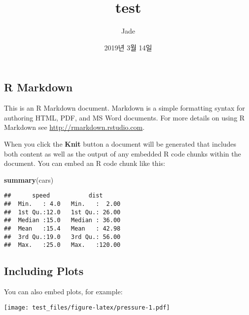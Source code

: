 \documentclass[]{article}
\title{test}
\author{Jade}
\date{2019년 3월 14일}
\newenvironment{Shaded}{\begin{snugshade}}{\end{snugshade}}
\newcommand{\KeywordTok}[1]{\textcolor[rgb]{0.13,0.29,0.53}{\textbf{#1}}}
\newcommand{\NormalTok}[1]{#1}
\begin{document}
\maketitle

\subsection{R Markdown}\label{r-markdown}

This is an R Markdown document. Markdown is a simple formatting syntax
for authoring HTML, PDF, and MS Word documents. For more details on
using R Markdown see \url{http://rmarkdown.rstudio.com}.

When you click the \textbf{Knit} button a document will be generated
that includes both content as well as the output of any embedded R code
chunks within the document. You can embed an R code chunk like this:

\begin{Shaded}
\begin{Highlighting}[]
\KeywordTok{summary}\NormalTok{(cars)}
\end{Highlighting}
\end{Shaded}

\begin{verbatim}
##      speed           dist       
##  Min.   : 4.0   Min.   :  2.00  
##  1st Qu.:12.0   1st Qu.: 26.00  
##  Median :15.0   Median : 36.00  
##  Mean   :15.4   Mean   : 42.98  
##  3rd Qu.:19.0   3rd Qu.: 56.00  
##  Max.   :25.0   Max.   :120.00
\end{verbatim}

\subsection{Including Plots}\label{including-plots}

You can also embed plots, for example:

\texttt{[image: test\_files/figure-latex/pressure-1.pdf]}
\end{document}

